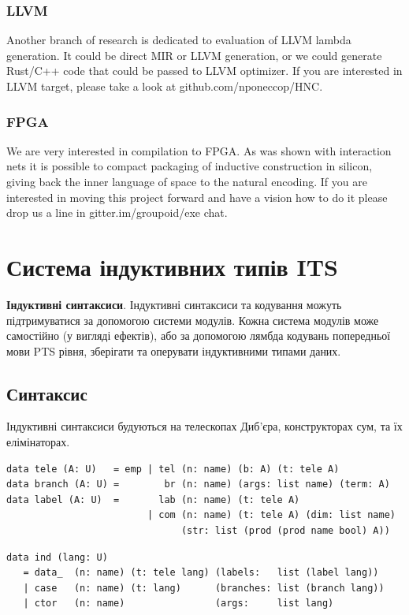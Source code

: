 \begin{definition}
\begin{definition}
\begin{definition}
\begin{definition}
\subsubsection{LLVM}

Another branch of research is dedicated to evaluation of LLVM lambda generation. It could be direct MIR or LLVM generation, or we could generate Rust/C++ code that could be passed to LLVM optimizer. If you are interested in LLVM target, please take a look at github.com/nponeccop/HNC.

\subsubsection{FPGA}

We are very interested in compilation to FPGA. As was shown with interaction nets it is possible to compact packaging of inductive construction in silicon, giving back the inner language of space to the natural encoding. If you are interested in moving this project forward and have a vision how to do it please drop us a line in gitter.im/groupoid/exe chat.

\newpage
\section{Система індуктивних типів ITS}

{\bf Індуктивні синтаксиси}. Індуктивні синтаксиси та кодування можуть підтримуватися за допомогою системи модулів.
Кожна система модулів може самостійно (у вигляді ефектів), або за допомогою лямбда кодувань
попередньої мови PTS рівня, зберігати та оперувати індуктивними типами даних.

\subsection{Синтаксис}

Індуктивні синтаксиси будуються на телескопах Диб'єра,
конструкторах сум, та їх елімінаторах.

\begin{lstlisting}
data tele (A: U)   = emp | tel (n: name) (b: A) (t: tele A)
data branch (A: U) =        br (n: name) (args: list name) (term: A)
data label (A: U)  =       lab (n: name) (t: tele A)
                         | com (n: name) (t: tele A) (dim: list name)
                               (str: list (prod (prod name bool) A))
\end{lstlisting}

\begin{lstlisting}
data ind (lang: U)
   = data_  (n: name) (t: tele lang) (labels:   list (label lang))
   | case   (n: name) (t: lang)      (branches: list (branch lang))
   | ctor   (n: name)                (args:     list lang)
\end{lstlisting}


\end{definition}
\end{definition}
\end{definition}
\end{definition}

